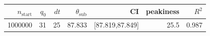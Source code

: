 \begin{tabular}{r r r r r r r}
\hline
$n_{\mathrm{start}}$ & $q_0$ & $dt$ & $\theta_{\mathrm{sub}}$ & CI & peakiness & $R^2$ \\
\hline
1000000 & 31 & 25 & 87.833 & [87.819,87.849] & 25.5 & 0.987 \\
\hline
\end{tabular}

